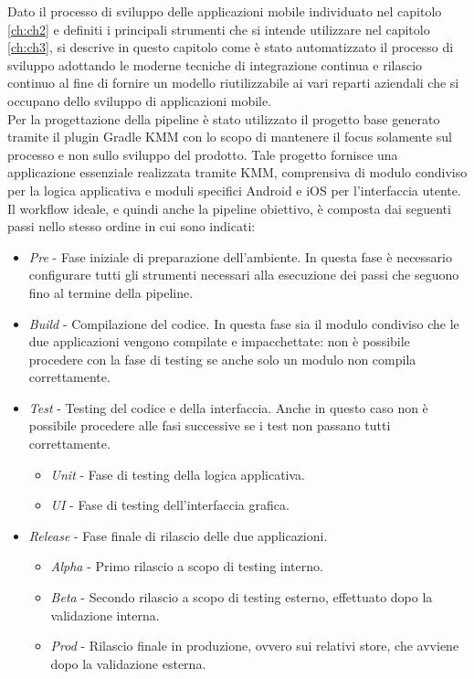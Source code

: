 
Dato il processo di sviluppo delle applicazioni mobile individuato nel capitolo \ref{ch:ch2} e definiti i principali strumenti che si intende utilizzare nel capitolo \ref{ch:ch3}, si descrive in questo capitolo come è stato automatizzato il processo di sviluppo adottando le moderne tecniche di integrazione continua e rilascio continuo al fine di fornire un modello riutilizzabile ai vari reparti aziendali che si occupano dello sviluppo di applicazioni mobile.\\
Per la progettazione della pipeline è stato utilizzato il progetto base generato tramite il plugin Gradle KMM con lo scopo di mantenere il focus solamente sul processo e non sullo sviluppo del prodotto. Tale progetto fornisce una applicazione essenziale realizzata tramite KMM, comprensiva di modulo condiviso per la logica applicativa e moduli specifici Android e iOS per l'interfaccia utente.\\
Il workflow ideale, e quindi anche la pipeline obiettivo, è composta dai seguenti passi nello stesso ordine in cui sono indicati:
\begin{itemize}
    \item \textit{Pre} - Fase iniziale di preparazione dell'ambiente. In questa fase è necessario configurare tutti gli strumenti necessari alla esecuzione dei passi che seguono fino al termine della pipeline.
    \item \textit{Build} - Compilazione del codice. In questa fase sia il modulo condiviso che le due applicazioni vengono compilate e impacchettate: non è possibile procedere con la fase di testing se anche solo un modulo non compila correttamente.
    \item \textit{Test} - Testing del codice e della interfaccia. Anche in questo caso non è possibile procedere alle fasi successive se i test non passano tutti correttamente.
    \begin{itemize}
        \item \textit{Unit} - Fase di testing della logica applicativa.
        \item \textit{UI} - Fase di testing dell'interfaccia grafica.
    \end{itemize}
    \item \textit{Release} - Fase finale di rilascio delle due applicazioni.
    \begin{itemize}
        \item \textit{Alpha} - Primo rilascio a scopo di testing interno.
        \item \textit{Beta} - Secondo rilascio a scopo di testing esterno, effettuato dopo la validazione interna.
        \item \textit{Prod} - Rilascio finale in produzione, ovvero sui relativi store, che avviene dopo la validazione esterna.
    \end{itemize}
\end{itemize}

